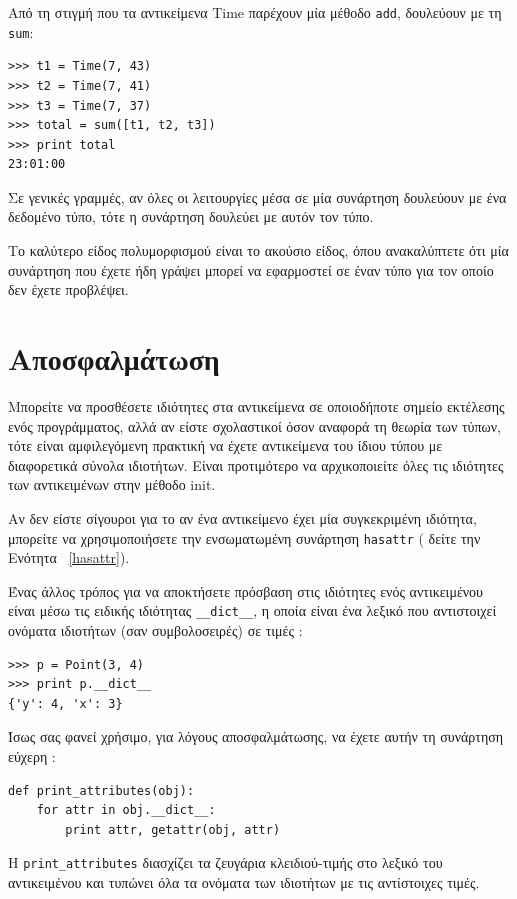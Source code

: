 \documentclass[10pt]{book}
\begin{document}
Από τη στιγμή που τα αντικείμενα  Time  παρέχουν μία μέθοδο  {\tt add},  
δουλεύουν με τη  {\tt sum}:

\begin{verbatim}
>>> t1 = Time(7, 43)
>>> t2 = Time(7, 41)
>>> t3 = Time(7, 37)
>>> total = sum([t1, t2, t3])
>>> print total
23:01:00
\end{verbatim}
%
 Σε γενικές γραμμές, αν όλες οι λειτουργίες μέσα σε μία συνάρτηση δουλεύουν με ένα δεδομένο τύπο, τότε η συνάρτηση δουλεύει με αυτόν τον τύπο.

Το καλύτερο είδος πολυμορφισμού είναι το ακούσιο είδος, όπου ανακαλύπτετε ότι μία συνάρτηση που έχετε ήδη γράψει μπορεί να εφαρμοστεί σε έναν τύπο για τον οποίο δεν έχετε προβλέψει.


\section{Αποσφαλμάτωση}

Μπορείτε να προσθέσετε ιδιότητες στα αντικείμενα σε οποιοδήποτε σημείο εκτέλεσης ενός 
προγράμματος, αλλά αν είστε σχολαστικοί όσον αναφορά τη θεωρία των τύπων, τότε είναι αμφιλεγόμενη πρακτική να έχετε αντικείμενα του ίδιου τύπου με διαφορετικά σύνολα ιδιοτήτων.  Είναι προτιμότερο να αρχικοποιείτε όλες τις ιδιότητες των αντικειμένων στην μέθοδο  init.

 
Αν δεν είστε σίγουροι για το αν ένα αντικείμενο έχει μία συγκεκριμένη ιδιότητα, μπορείτε 
να χρησιμοποιήσετε την ενσωματωμένη συνάρτηση  {\tt hasattr} ( δείτε την Ενότητα~ \ref{hasattr}).

 Ένας άλλος τρόπος για να αποκτήσετε πρόσβαση στις ιδιότητες ενός αντικειμένου είναι μέσω τις ειδικής ιδιότητας  \verb"__dict__",  η οποία είναι ένα λεξικό που αντιστοιχεί ονόματα ιδιοτήτων (σαν συμβολοσειρές) σε τιμές :

\begin{verbatim}
>>> p = Point(3, 4)
>>> print p.__dict__
{'y': 4, 'x': 3}
\end{verbatim}
%
 Ίσως σας φανεί χρήσιμο, για λόγους αποσφαλμάτωσης, να έχετε αυτήν τη συνάρτηση εύχερη : 

\begin{verbatim}
def print_attributes(obj):
    for attr in obj.__dict__:
        print attr, getattr(obj, attr)
\end{verbatim}
%
 Η  \verb"print_attributes"  διασχίζει τα ζευγάρια κλειδιού-τιμής στο λεξικό του αντικειμένου και τυπώνει όλα τα ονόματα των ιδιοτήτων με τις αντίστοιχες τιμές.
\end{document}

